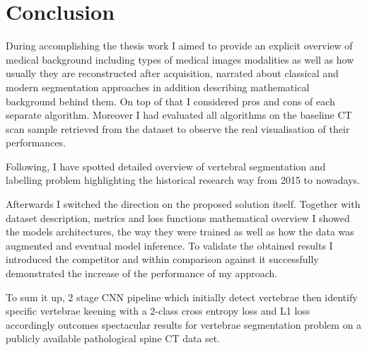 \chapter{Conclusion}
\label{ch:conclusion}
During accomplishing the thesis work I aimed to provide an explicit overview of medical background including types of medical images modalities as well as how usually they are reconstructed after acquisition, narrated about classical and modern segmentation approaches in addition describing mathematical background behind them. On top of that I considered pros and cons of each separate algorithm. Moreover I had evaluated all algorithms on the baseline CT scan sample retrieved from the dataset to observe the real visualisation of their performances. 

Following, I have spotted detailed overview of vertebral segmentation and labelling problem highlighting the historical research way from 2015 to nowadays.  

Afterwards I switched the direction on the proposed solution itself. Together with dataset description, metrics and loss functions mathematical overview I showed the models architectures, the way they were trained as well as how the data was augmented and eventual model inference. To validate the obtained results I introduced the competitor and within comparison against it successfully demonstrated the increase of the performance of my approach.


To sum it up, 2 stage CNN pipeline which initially detect vertebrae then identify specific vertebrae keening with a 2-class cross entropy loss and L1 loss accordingly outcomes spectacular results for vertebrae segmentation problem on a publicly available pathological spine CT data set. 